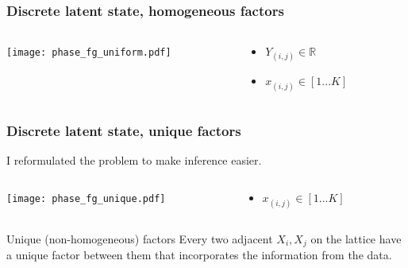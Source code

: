 \documentclass[compress]{beamer}
\begin{document}
\begin{frame}
  \frametitle{Discrete latent state, homogeneous factors}
  \begin{columns}
    \begin{column}{5cm}
      \texttt{[image: phase\_fg\_uniform.pdf]}
    \end{column}
    \begin{column}{5cm}
      \begin{itemize}
      \item $Y_{(i, j)} \in \mathbb{R}$
      \item $x_{(i, j)} \in [1 ... K]$
      \end{itemize}
    \end{column}
  \end{columns}
  
  

    


\end{frame}
  
\begin{frame}
  \frametitle{Discrete latent state, unique factors}
  I reformulated the problem to make inference easier. 
  \vspace{1cm}
  \begin{columns}
    \begin{column}{5cm}
      \texttt{[image: phase\_fg\_unique.pdf]}
    \end{column}
    \begin{column}{5cm}
      \begin{itemize}
      \item $x_{(i, j)} \in [1 ... K]$
      \end{itemize}
    \end{column}
  \end{columns}
  
  \vspace{1cm}
  \begin{block}{Unique (non-homogeneous) factors} 
    Every two adjacent $X_i, X_j$ on the lattice have a unique factor
    between them that incorporates the information from the data. 
  \end{block}
\end{frame} 
\end{document}
